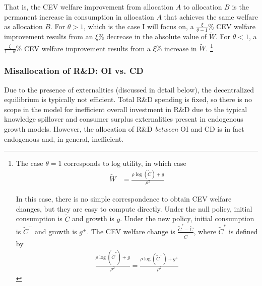 \documentclass[11pt,english]{article}
\begin{document}
That is, the CEV welfare improvement from allocation $A$ to allocation $B$ is the permanent increase in consumption in allocation $A$ that achieves the same welfare as allocation $B$.  For $\theta > 1$, which is the case I will focus on, a $\frac{\xi}{\theta-1}\%$ CEV welfare improvement results from an $\xi\%$ decrease in the absolute value of $\tilde{W}$. For $\theta < 1$, a $\frac{\xi}{1-\theta}\%$ CEV welfare improvement results from a $\xi\%$ increase in $\tilde{W}$. \footnote{The case $\theta = 1$ corresponds to log utility, in which case
	\begin{align}
	\tilde{W} &= \frac{\rho \log(\tilde{C}) + g}{\rho^2} \label{eq:agg_welfare_log}
	\end{align}
	
	In this case, there is no simple correspondence to obtain CEV welfare changes, but they are easy to compute directly. Under the null policy, initial consumption is $\tilde{C}$ and growth is $g$. Under the new policy, initial consumption is $\tilde{C}^+$ and growth is $g^+$. The CEV welfare change is $\frac{\tilde{C}^* - \tilde{C}}{\tilde{C}}$, where $\tilde{C}^*$ is defined by 
	\begin{align}
	\frac{\rho\log(\tilde{C}^*) + g}{\rho^2} = \frac{\rho \log(\tilde{C}^+) + g^+}{\rho^2} \label{eq:agg_welfare_log_CEV}
	\end{align}}

\subsubsection{Misallocation of R\&D: OI vs. CD}\label{model:properties:misallocation}

Due to the presence of externalities (discussed in detail below), the decentralized equilibrium is typically not efficient. Total R\&D spending is fixed, so there is no scope in the model for inefficient overall investment in R\&D due to the typical knowledge spillover and consumer surplus externalities present in endogenous growth models. However, the allocation of R\&D \textit{between} OI and CD is in fact endogenous and, in general, inefficient. 
\end{document}
